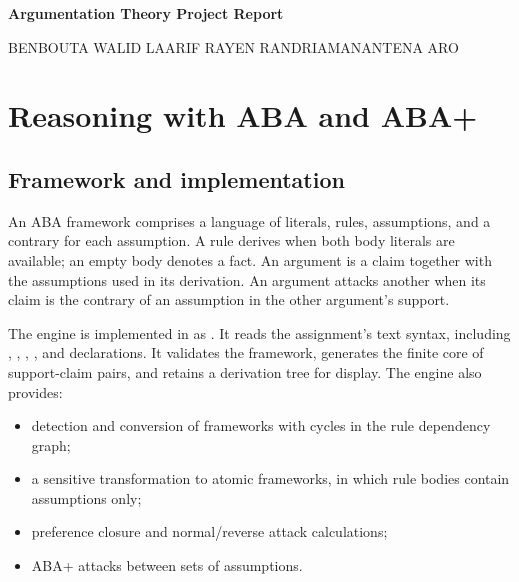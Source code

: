 \documentclass[11pt,a4paper]{article}
\newcommand{\code}[1]{\texttt{\detokenize{#1}}}
\begin{document}
\begin{center}
{\LARGE\bfseries Argumentation Theory Project Report\par}
\vspace{0.75em}
\vspace{0.25em}
{BENBOUTA WALID \textbullet{} LAARIF RAYEN \textbullet{} RANDRIAMANANTENA ARO\par}
\end{center}

\begin{abstract}
This project implements an Assumption-Based Argumentation (ABA/ABA+) generator, builds and evaluates relation-classification and relation-discovery baselines on a snapshot of Kialo discussions, and visualizes acceptability-degree spaces for weighted h-categorizer semantics. The ABA generator parses frameworks, constructs arguments and attacks, handles preferences, and converts frameworks to non-circular and atomic forms. The Kialo pipeline parses 250 discussion exports into 94,707 claims and evaluates models using discussion-level data splits. The gradual-semantics experiment samples intrinsic weights, computes h-categorizer scores, and compares projected density maps across frameworks, sample sizes, and random seeds.
\end{abstract}

\section{Reasoning with ABA and ABA+}

\subsection{Framework and implementation}

An ABA framework comprises a language of literals, rules, assumptions, and a contrary for each assumption. A rule \code{h <- b1,b2} derives \code{h} when both body literals are available; an empty body denotes a fact. An argument is a claim together with the assumptions used in its derivation. An argument attacks another when its claim is the contrary of an assumption in the other argument's support.

The engine is implemented in \code{aba.py} as \code{ABAFramework}. It reads the assignment's text syntax, including \code{L:}, \code{A:}, \code{C(a):}, \code{[r1]: ...}, and \code{PREF:} declarations. It validates the framework, generates the finite core of support-claim pairs, and retains a derivation tree for display. The engine also provides:
\begin{itemize}
  \item detection and conversion of frameworks with cycles in the rule dependency graph;
  \item a sensitive transformation to atomic frameworks, in which rule bodies contain assumptions only;
  \item preference closure and normal/reverse attack calculations;
  \item ABA+ attacks between sets of assumptions.
\end{itemize}
\end{document}
